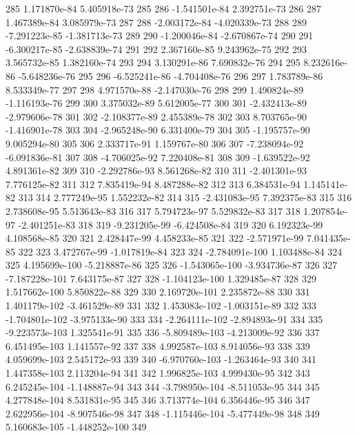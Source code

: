 \documentclass{article}
\begin{document}
\begin{Schunk}
\begin{Soutput}
285    1.171870e-84   5.405918e-73  285
286   -1.541501e-84   2.392751e-73  286
287    1.467389e-84   3.085979e-73  287
288   -2.003172e-84  -4.020339e-73  288
289   -7.291223e-85  -1.381713e-73  289
290   -1.200046e-84  -2.670867e-74  290
291   -6.300217e-85  -2.638839e-74  291
292    2.367160e-85   9.243962e-75  292
293    3.565732e-85   1.382160e-74  293
294    3.130291e-86   7.690832e-76  294
295    8.232616e-86  -5.648236e-76  295
296   -6.525241e-86  -4.704408e-76  296
297    1.783789e-86   8.533349e-77  297
298    4.971570e-88  -2.147030e-76  298
299    1.490824e-89  -1.116193e-76  299
300    3.375032e-89   5.612005e-77  300
301   -2.432413e-89  -2.979606e-78  301
302   -2.108377e-89   2.455389e-78  302
303    8.703765e-90  -1.416901e-78  303
304   -2.965248e-90   6.331400e-79  304
305   -1.195757e-90   9.005294e-80  305
306    2.333717e-91   1.159767e-80  306
307   -7.238094e-92  -6.091836e-81  307
308   -4.706025e-92   7.220408e-81  308
309   -1.639522e-92   4.891361e-82  309
310   -2.292786e-93   8.561268e-82  310
311   -2.401301e-93   7.776125e-82  311
312    7.835419e-94   8.487288e-82  312
313    6.384531e-94   1.145141e-82  313
314    2.777249e-95   1.552232e-82  314
315   -2.431083e-95   7.392375e-83  315
316    2.738608e-95   5.513643e-83  316
317    5.794723e-97   5.529832e-83  317
318    1.207854e-97  -2.401251e-83  318
319   -9.231205e-99  -6.424508e-84  319
320    6.192323e-99   4.108568e-85  320
321    2.428447e-99   4.458233e-85  321
322   -2.571971e-99   7.041435e-85  322
323    3.472767e-99  -1.017819e-84  323
324  -2.784091e-100   1.103488e-84  324
325   4.195699e-100  -5.218887e-86  325
326  -1.543065e-100  -3.934736e-87  326
327  -7.187228e-101   7.643175e-87  327
328  -1.104123e-100   1.329485e-87  328
329   1.517662e-100   5.850822e-88  329
330   2.169720e-101   2.235872e-88  330
331   1.401179e-102  -3.461529e-89  331
332   1.453083e-102  -1.003151e-89  332
333  -1.704801e-102  -3.975133e-90  333
334  -2.264111e-102  -2.894893e-91  334
335  -9.223573e-103   1.325541e-91  335
336  -5.809489e-103  -4.213009e-92  336
337   6.451495e-103   1.141557e-92  337
338   4.992587e-103   8.914056e-93  338
339   4.059699e-103   2.545172e-93  339
340  -6.970760e-103  -1.263464e-93  340
341   1.447358e-103   2.113204e-94  341
342   1.996825e-103   4.999430e-95  342
343   6.245245e-104  -1.148887e-94  343
344  -3.798950e-104  -8.511053e-95  344
345   4.277848e-104   8.531831e-95  345
346   3.713774e-104   6.356446e-95  346
347   2.622956e-104  -8.907546e-98  347
348  -1.115446e-104  -5.477449e-98  348
349   5.160683e-105 -1.448252e-100  349

\end{Soutput}
\end{Schunk}
\end{document}
